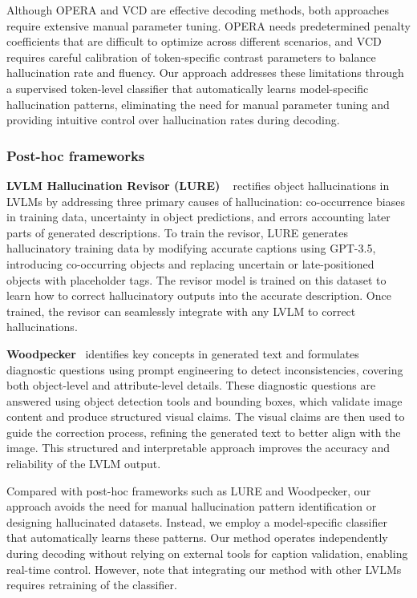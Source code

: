 Although OPERA and VCD are effective decoding methods, both approaches require extensive manual parameter tuning. OPERA needs predetermined penalty coefficients that are difficult to optimize across different scenarios, and VCD requires careful calibration of token-specific contrast parameters to balance hallucination rate and fluency. Our approach addresses these limitations through a supervised token-level classifier that automatically learns model-specific hallucination patterns, eliminating the need for manual parameter tuning and providing intuitive control over hallucination rates during decoding.

\subsubsection{Post-hoc frameworks}\label{subsubsec-posthoc}
\textbf{LVLM Hallucination Revisor (LURE)} ~\cite{zhou2023analyzing} rectifies object hallucinations in LVLMs by addressing three primary causes of hallucination: co-occurrence biases in training data, uncertainty in object predictions, and errors accounting later parts of generated descriptions. To train the revisor, LURE generates hallucinatory training data by modifying accurate captions using GPT-3.5, introducing co-occurring objects and replacing uncertain or late-positioned objects with placeholder tags. The revisor model is trained on this dataset to learn how to correct hallucinatory outputs into the accurate description. Once trained, the revisor can seamlessly integrate with any LVLM to correct hallucinations. 

\textbf{Woodpecker}~\cite{yin2024woodpecker} identifies key concepts in generated text and formulates diagnostic questions using prompt engineering to detect inconsistencies, covering both object-level and attribute-level details. These diagnostic questions are answered using object detection tools and bounding boxes, which validate image content and produce structured visual claims. The visual claims are then used to guide the correction process, refining the generated text to better align with the image. This structured and interpretable approach improves the accuracy and reliability of the LVLM output.

Compared with post-hoc frameworks such as LURE and Woodpecker, our approach avoids the need for manual hallucination pattern identification or designing hallucinated datasets. Instead, we employ a model-specific classifier that automatically learns these patterns. Our method operates independently during decoding without relying on external tools for caption validation, enabling real-time control. However, note that integrating our method with other LVLMs requires retraining of the classifier.

